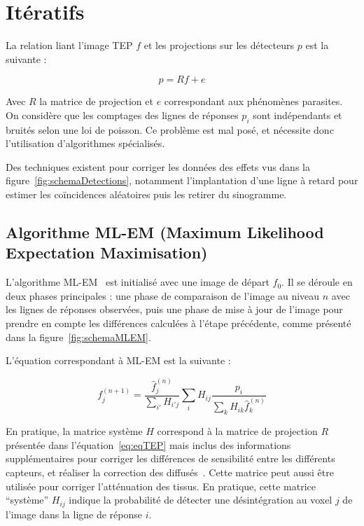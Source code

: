 	\section{Itératifs}

La relation liant l'image TEP $f$ et les projections sur les détecteurs $p$ est la suivante :

\begin{equation}
	p = R f + e
\label{eq:eqTEP}
\end{equation}

Avec $R$ la matrice de projection et $e$ correspondant aux phénomènes parasites. On considère que les comptages des lignes de réponses $p_i$ sont indépendants et bruités selon une loi de poisson. Ce problème est mal posé, et nécessite donc l'utilisation d'algorithmes spécialisés. 

Des techniques existent pour corriger les données des effets vus dans la figure~\ref{fig:schemaDetections}, notamment l'implantation d'une ligne à retard pour estimer les coïncidences aléatoires puis les retirer du sinogramme.

		\subsection{Algorithme ML-EM (Maximum Likelihood Expectation Maximisation) }


L'algorithme ML-EM~\cite{shepp1982maximum} est initialisé avec une image de départ $f_0$. Il se déroule en deux phases principales : une phase de comparaison de l'image au niveau $n$ avec les lignes de réponses observées, puis une phase de mise à jour de l'image pour prendre en compte les différences calculées à l'étape précédente, comme présenté dans la figure~\ref{fig:schemaMLEM}.


L'équation correspondant à ML-EM est la suivante :

\begin{equation}
	f_j^{(n+1)}=\frac{\hat{f}_j^{(n)}}{\sum\limits_{i'}H_{i'j}}\sum\limits_{i}H_{ij}\frac{p_i}{\sum\limits_{k}H_{ik}\hat{f}_k^{(n)}}
\label{eq:MLEM}
\end{equation}

En pratique, la matrice système $H$ correspond à la matrice de projection $R$ présentée dans l'équation~\ref{eq:eqTEP} mais inclus des informations supplémentaires pour corriger les différences de sensibilité entre les différents capteurs, et réaliser la correction des diffusés~\cite{shepp1982maximum,chornoboy1990evaluation}. Cette matrice peut aussi être utilisée pour corriger l'atténuation des tissus. En pratique, cette matrice ``système'' $H_{ij}$ indique la probabilité de détecter une désintégration au voxel $j$ de l'image dans la ligne de réponse $i$.




